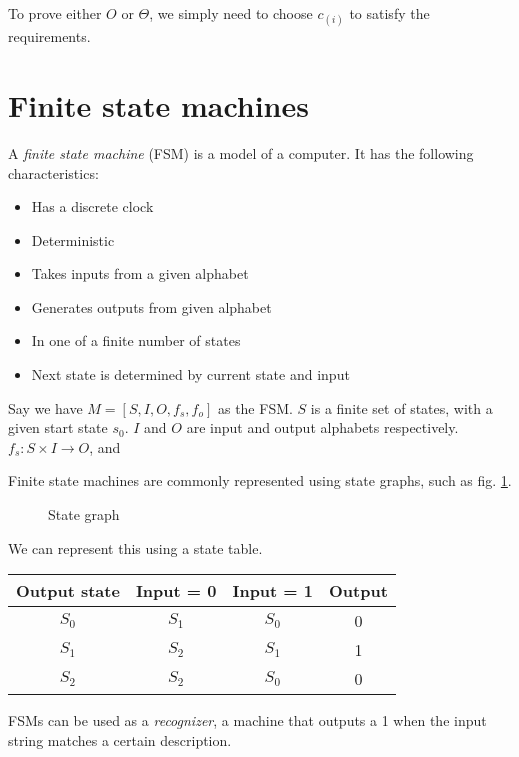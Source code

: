 \documentclass[nobib]{tufte-handout}
\begin{document}
To prove either $O$ or $\Theta$, we simply need to choose $c_{(i)}$
to satisfy the requirements. 

\section{Finite state machines}
A \emph{finite state machine} (FSM) is a model 
of a computer. It has the following characteristics: 
\begin{itemize}
    \item Has a discrete clock
    \item Deterministic
    \item Takes inputs from a given alphabet 
    \item Generates outputs from given alphabet 
    \item In one of a finite number of states 
    \item Next state is determined by current state and input 
\end{itemize}
Say we have $M = \left[S,I,O,f_s,f_o\right]$ as the FSM. 
$S$ is a finite set of states, with a given start state $s_0$. 
$I$ and $O$ are input and output alphabets respectively. 
$f_s: S\times I \rightarrow O$, and %

Finite state machines are commonly represented using state graphs, 
such as fig. \ref{fig:stategraph}. 
\begin{figure}
    \caption{State graph}
    \label{fig:stategraph}
    \begin{center}
    \end{center}
\end{figure}
We can represent this using a state table.
\begin{tabular}{c | c c | c}
    \toprule 
    Output state & Input = 0 & Input = 1 & Output \\
    \hline 
    $S_0$ & $S_1$ & $S_0$ & 0 \\
    $S_1$ & $S_2$ & $S_1$ & 1 \\
    $S_2$ & $S_2$ & $S_0$ & 0 \\
    \bottomrule
\end{tabular}

FSMs can be used as a \emph{recognizer}, a machine 
that outputs a 1 when the input string matches a 
certain description. 
\end{document}
